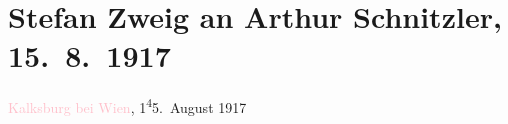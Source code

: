 

\renewcommand{\erwaehntePersonen}{Personen: Olga Schnitzler, Franz Werfel, Stefan Zweig}
\renewcommand{\erwaehnteOrte}{Orte: Kalksburg, Sternwartestraße 71, Wien}
\renewcommand{\erwaehnteWerke}{Werke: Der junge Medardus. Dramatische Historie in einem Vorspiel und fünf Aufzügen, Doktor Gräsler, Badearzt, Jeremias. Ein dramatische Dichtung in neun Bildern}
\section[Stefan Zweig an Arthur Schnitzler, 15. 8. 1917]{Stefan Zweig an Arthur Schnitzler, 15. 8. 1917}
\nopagebreak{}
\rehead{ }\normalsize\beginnumbering{}
\toendnotes[C]{\smallbreak\pagebreak[2]}
\toendnotes[C]{\smallbreak}
\pstart
           {\pb}\textcolor{pink}{Kalksburg bei Wien}{}\ledrightnote{\textcolor{pink}{Kalksburg}}, 1\substVorne{}\textsuperscript{4}\substDazwischen{}5\substHinten{}. August 1917\pend
           
